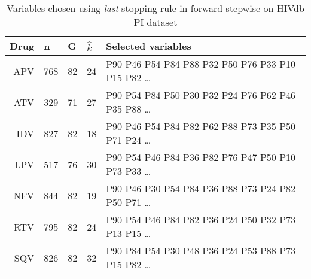 \begin{table}[ht]
\centering
\begin{tabular}{rllll}
  \hline
 Drug & n & G & $\hat k$ & Selected variables \\ 
  \hline
 APV & 768 & 82 & 24 & P90 P46 P54 P84 P88 P32 P50 P76 P33 P10 P15 P82
\ldots \\ %
 ATV & 329 & 71 & 27 & P90 P54 P84 P50 P30 P32 P24 P76 P62 P46 P35 P88
 \ldots \\ %
 IDV & 827 & 82 & 18 & P90 P46 P54 P84 P82 P62 P88 P73 P35 P50 P71 P24
 \ldots \\ %
 LPV & 517 & 76 & 30 & P90 P54 P46 P84 P36 P82 P76 P47 P50 P10 P73 P33
 \ldots \\ %
 NFV & 844 & 82 & 19  & P90 P46 P30 P54 P84 P36 P88 P73 P24 P82 P50
 P71
 \ldots \\ %
 RTV & 795 & 82 & 24  & P90 P54 P46 P84 P82 P36 P24 P50 P32 P73 P13 P15
  \ldots \\ %
 SQV & 826 & 82 & 32 & P90 P84 P54 P30 P48 P36 P24 P53 P88 P73 P15 P82
 \ldots \\ %
   \hline
\end{tabular}
\caption{Variables chosen using \textit{last} stopping rule in forward
  stepwise on HIVdb PI dataset} 
\label{tab:hivPI}
\end{table}

